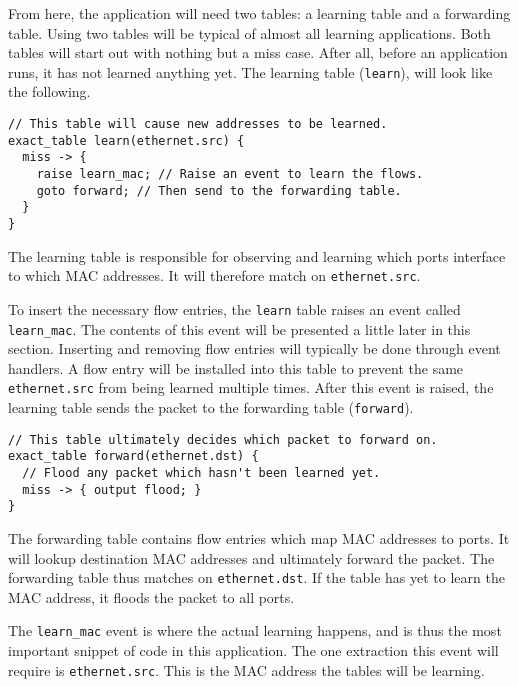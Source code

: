 From here, the application will need two tables: a learning table and a forwarding table.
Using two tables will be typical of almost all learning applications. Both
tables will start out with nothing but a miss case. After all, before an
application runs, it has not learned anything yet. 
The learning table (\texttt{learn}), will look like the following.

\begin{codepage}
\begin{lstlisting}
// This table will cause new addresses to be learned.
exact_table learn(ethernet.src) {
  miss -> {
  	raise learn_mac; // Raise an event to learn the flows.
    goto forward; // Then send to the forwarding table.
  }
}
\end{lstlisting}
\end{codepage}

The learning table is responsible for observing and learning which
ports interface to which MAC addresses.
It will therefore match on \texttt{ethernet.src}. 

To insert the necessary flow entries, the \texttt{learn} table raises an event
called \texttt{learn\_mac}. The contents of this event will be presented a little later in this section.
Inserting and removing flow entries will typically be done through event handlers.
A flow entry will be installed into this
table to prevent the same \texttt{ethernet.src} from being learned multiple
times.
After this event is raised, the learning table sends the packet to the
forwarding table (\texttt{forward}).

\begin{codepage}
\begin{lstlisting}
// This table ultimately decides which packet to forward on.
exact_table forward(ethernet.dst) {
  // Flood any packet which hasn't been learned yet.
  miss -> { output flood; }
}
\end{lstlisting}
\end{codepage}

The forwarding table contains flow entries which map MAC addresses to ports. It will lookup destination MAC addresses and ultimately forward the packet. The forwarding table thus
matches on \texttt{ethernet.dst}. If the table has yet to learn the MAC address, it floods the packet to all ports.

The \texttt{learn\_mac} event is where the actual
learning happens, and is thus the most important snippet of code in this
application. The one extraction this event will require is \texttt{ethernet.src}.
This is the MAC address the tables will be learning.

